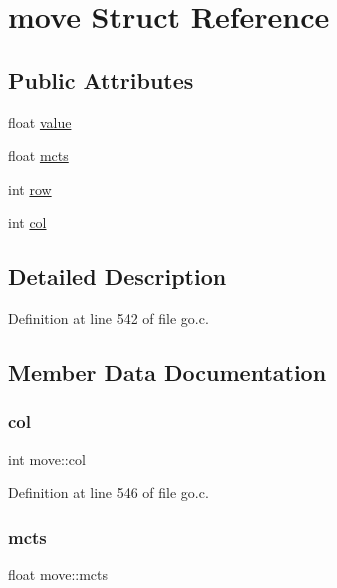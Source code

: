 \hypertarget{structmove}{}\section{move Struct Reference}
\label{structmove}
\subsection*{Public Attributes}
\begin{DoxyCompactItemize}
\item 
float \mbox{\hyperlink{structmove_ad5c6f0e63c04917e2136302cdc91c8c9}{value}}
\item 
float \mbox{\hyperlink{structmove_ad8ad6dbebccc053ed00711fdfd8f7a6d}{mcts}}
\item 
int \mbox{\hyperlink{structmove_aa437d87395d9a7ae28b49eb49c5fdfe9}{row}}
\item 
int \mbox{\hyperlink{structmove_a01c0e5f86caca6c5e6d28968cb1f122a}{col}}
\end{DoxyCompactItemize}


\subsection{Detailed Description}


Definition at line 542 of file go.\+c.



\subsection{Member Data Documentation}
\mbox{\label{structmove_a01c0e5f86caca6c5e6d28968cb1f122a}} 
\subsubsection{\texorpdfstring{col}{col}}
{\footnotesize\ttfamily int move\+::col}



Definition at line 546 of file go.\+c.

\mbox{\label{structmove_ad8ad6dbebccc053ed00711fdfd8f7a6d}} 
\subsubsection{\texorpdfstring{mcts}{mcts}}
{\footnotesize\ttfamily float move\+::mcts}



